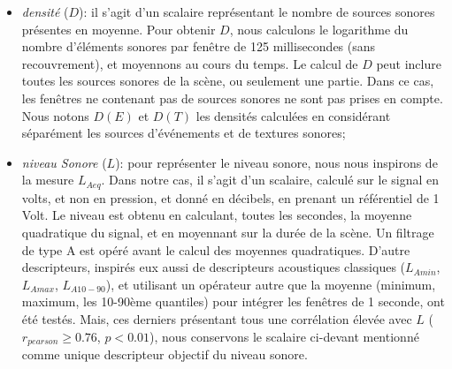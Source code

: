 \begin{itemize}
\begin{itemize}
\item \emph{densité} ($D$): il s'agit d'un scalaire représentant le nombre de sources sonores présentes en moyenne. Pour obtenir $D$, nous calculons le logarithme du nombre d'éléments sonores par fenêtre de 125 millisecondes (sans recouvrement), et moyennons au cours du temps. Le calcul de $D$ peut inclure toutes les sources sonores de la scène, ou seulement une partie. Dans ce cas, les fenêtres ne contenant pas de sources sonores ne sont pas prises en compte. Nous notons $D(E)$ et $D(T)$ les densités calculées en considérant séparément les sources d'événements et de textures sonores;
\item \emph{niveau Sonore} ($L$): pour représenter le niveau sonore, nous nous inspirons de la mesure $L_{Aeq}$. Dans notre cas, il s'agit d'un scalaire, calculé sur le signal en volts, et non en pression, et donné en décibels, en prenant un référentiel de 1 Volt. Le niveau est obtenu en calculant, toutes les secondes, la moyenne quadratique du signal, et en moyennant sur la durée de la scène. Un filtrage de type A est opéré avant le calcul des moyennes quadratiques. D'autre descripteurs, inspirés eux aussi de descripteurs acoustiques classiques ($L_{Amin}$, $L_{Amax}$, $L_{A10-90}$), et utilisant un opérateur autre que la moyenne (minimum, maximum, les 10-90ème quantiles) pour intégrer les fenêtres de 1 seconde, ont été testés. Mais, ces derniers présentant tous une corrélation élevée avec $L$ ($r_{pearson}\geq0.76$, $p<0.01$), nous conservons le scalaire ci-devant mentionné comme unique descripteur objectif du niveau sonore.
\end{itemize}
\end{itemize}


